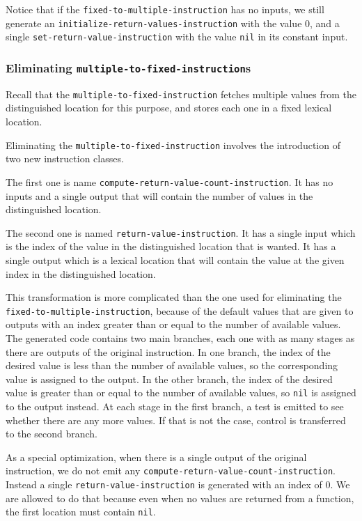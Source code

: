 Notice that if the \texttt{fixed-to-multiple-instruction} has no
inputs, we still generate an
\texttt{initialize-return-values-instruction} with the value 0, and a
single \texttt{set-return-value-instruction} with the value
\texttt{nil} in its constant input.

\subsubsection{Eliminating \texttt{multiple-to-fixed-instruction}s}

Recall that the \texttt{multiple-to-fixed-instruction} fetches
multiple values from the distinguished location for this purpose, and
stores each one in a fixed lexical location.

Eliminating the \texttt{multiple-to-fixed-instruction} involves the
introduction of two new instruction classes.

The first one is name
\texttt{compute-return-value-count-instruction}.  It has no inputs and
a single output that will contain the number of values in the
distinguished location.

The second one is named \texttt{return-value-instruction}.  It has a
single input which is the index of the value in the distinguished
location that is wanted.  It has a single output which is a lexical
location that will contain the value at the given index in the
distinguished location.

This transformation is more complicated than the one used for
eliminating the \texttt{fixed-to-multiple-instruction}, because of the
default values that are given to outputs with an index greater than or
equal to the number of available values.  The generated code contains
two main branches, each one with as many stages as there are outputs
of the original instruction.  In one branch, the index of the desired
value is less than the number of available values, so the
corresponding value is assigned to the output.  In the other branch,
the index of the desired value is greater than or equal to the number
of available values, so \texttt{nil} is assigned to the output
instead.  At each stage in the first branch, a test is emitted to see
whether there are any more values.  If that is not the case, control
is transferred to the second branch.

As a special optimization, when there is a single output of the
original instruction, we do not emit any
\texttt{compute-return-value-count-instruction}.  Instead a single
\texttt{return-value-instruction} is generated with an index of $0$.
We are allowed to do that because even when no values are returned
from a function, the first location must contain \texttt{nil}.

